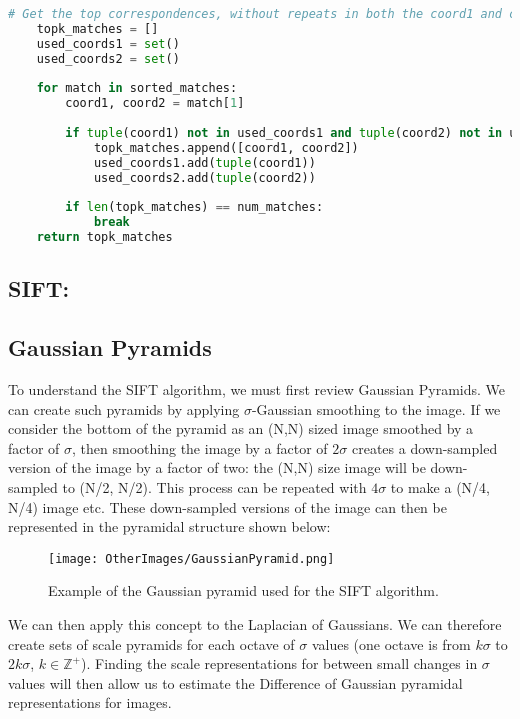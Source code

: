 \documentclass{article}
\begin{document}
\begin{lstlisting}[language=Python]
    # Get the top correspondences, without repeats in both the coord1 and coord2 values
    topk_matches = []
    used_coords1 = set()
    used_coords2 = set()
    
    for match in sorted_matches:
        coord1, coord2 = match[1]
        
        if tuple(coord1) not in used_coords1 and tuple(coord2) not in used_coords2:
            topk_matches.append([coord1, coord2])
            used_coords1.add(tuple(coord1))
            used_coords2.add(tuple(coord2))
        
        if len(topk_matches) == num_matches:
            break
    return topk_matches
\end{lstlisting}

\subsection{SIFT:}
\subsection{Gaussian Pyramids}
To understand the SIFT algorithm, we must first review Gaussian Pyramids. We can create such pyramids by applying $\sigma$-Gaussian smoothing to the image. If we consider the bottom of the pyramid as an (N,N) sized image smoothed by a factor of $\sigma$, then smoothing the image by a factor of $2\sigma$ creates a down-sampled version of the image by a factor of two: the (N,N) size image will be down-sampled to (N/2, N/2). This process can be repeated with $4\sigma$ to make a (N/4, N/4) image etc. These down-sampled versions of the image can then be represented in the pyramidal structure shown below: 
\begin{figure}[H]
    \centering
    \texttt{[image: OtherImages/GaussianPyramid.png]}
    \caption{Example of the Gaussian pyramid used for the SIFT algorithm.}
    \label{fig:gaussian-pyramid}
\end{figure}

We can then apply this concept to the Laplacian of Gaussians. We can therefore create sets of scale pyramids for each octave of $\sigma$ values (one octave is from $k\sigma$ to $2k\sigma$, $k\in\mathbb{Z}^+$). Finding the scale representations for between small changes in $\sigma$ values will then allow us to estimate the Difference of Gaussian pyramidal representations for images.
\end{document}
